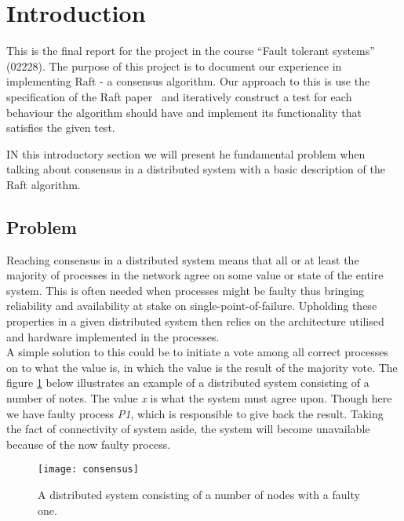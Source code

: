 \setcounter{page}{1}

\section{Introduction} %
\label{sec:introduction}

This is the final report for the project in the course ``Fault tolerant systems'' (02228). The purpose of this project is to document our experience in implementing Raft - a consensus algorithm. Our approach to this is use the specification of the Raft paper~\cite[p.~4]{Raft} and iteratively construct a test for each behaviour the algorithm should have and implement its functionality that satisfies the given test.

IN this introductory section we will present he fundamental problem when talking about consensus in a distributed system with a basic description of the Raft algorithm.

\subsection{Problem}
Reaching consensus in a distributed system means that all or at least the majority of processes in the network agree on some value or state of the entire system. This is often needed when processes might be faulty thus bringing reliability and availability at stake on single-point-of-failure. Upholding these properties in a given distributed system then relies on the architecture utilised and hardware implemented in the processes.\\ A simple solution to this could be to initiate a vote among all correct processes on to what the value is, in which the value is the result of the majority vote. The figure \ref{consensus} below illustrates an example of a distributed system consisting of a number of notes. The value \textit{x} is what the system must agree upon. Though here we have faulty process \textit{P1}, which is responsible to give back the result. Taking the fact of connectivity of system aside, the system will become unavailable because of the now faulty process. \\



\begin{figure}[h]
	\centering
	\texttt{[image: consensus]}
	\caption{A distributed system consisting of a number of nodes with a faulty one.}
	\label{consensus}
\end{figure}

